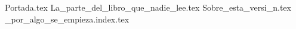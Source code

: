 {Portada.tex}
\tableofcontents
{La_parte_del_libro_que_nadie_lee.tex}
{Sobre_esta_versi_n.tex}
{_por_algo_se_empieza.index.tex}